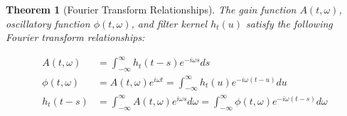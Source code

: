 \documentclass{article}
\newtheorem{theorem}{Theorem}
\begin{document}
\begin{theorem}[Fourier Transform Relationships]
  The gain function $A (t, \omega)$, oscillatory function $\phi (t, \omega)$,
  and filter kernel $h_t (u)$ satisfy the following Fourier transform
  relationships:
  
  \begin{align}
    A (t, \omega) & = \int_{- \infty}^{\infty} h_t  (t - s) e^{- i \omega s}
    ds \\
    \phi (t, \omega) & = A (t, \omega) e^{i \omega t} = \int_{-
    \infty}^{\infty} h_t (u) e^{- i \omega (t - u)} du \\
    h_t  (t - s) & = \int_{- \infty}^{\infty} A (t, \omega) e^{i \omega s} d
    \omega = \int_{- \infty}^{\infty} \phi (t, \omega) e^{- i \omega (t - s)}
    d \omega 
  \end{align}
\end{theorem}
\end{document}
